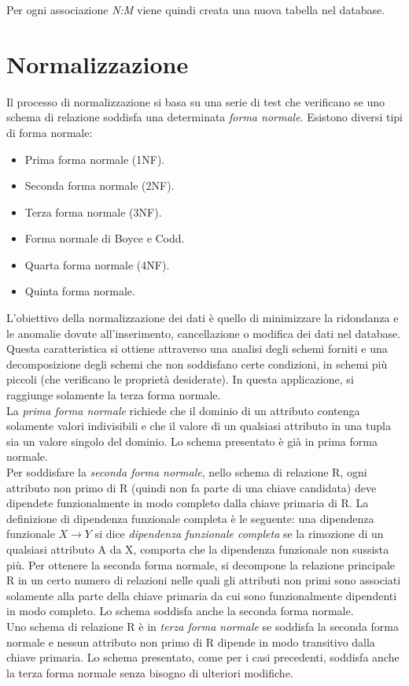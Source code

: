 \documentclass[paper=a4, fontsize=11pt,x11names]{report}
\begin{document}
Per ogni associazione \textit{N:M} viene quindi creata una nuova tabella nel database.

\chapter{Normalizzazione}
Il processo di normalizzazione si basa su una serie di test che verificano se uno schema di relazione soddisfa una determinata \textit{forma normale}. Esistono diversi tipi di forma normale:
\begin{itemize}
\item Prima forma normale (1NF).
\item Seconda forma normale (2NF).
\item Terza forma normale (3NF).
\item Forma normale di Boyce e Codd.
\item Quarta forma normale (4NF).
\item Quinta forma normale.
\end{itemize}
L'obiettivo della normalizzazione dei dati è quello di minimizzare la ridondanza e le anomalie dovute all'inserimento, cancellazione o modifica dei dati nel database. Questa caratteristica si ottiene attraverso una analisi degli schemi forniti e una decomposizione degli schemi che non soddisfano certe condizioni, in schemi più piccoli (che verificano le proprietà desiderate). In questa applicazione, si raggiunge solamente la terza forma normale.
\\
La \textit{prima forma normale} richiede che il dominio di un attributo contenga solamente valori indivisibili e che il valore di un qualsiasi attributo in una tupla sia un valore singolo del dominio. Lo schema presentato è già in prima forma normale.
\\
Per soddisfare la \textit{seconda forma normale}, nello schema di relazione R, ogni attributo non primo di R (quindi non fa parte di una chiave candidata) deve dipendete funzionalmente in modo completo dalla chiave primaria di R. La definizione di dipendenza funzionale completa è le seguente: una dipendenza funzionale $X \rightarrow Y$ si dice \textit{dipendenza funzionale completa} se la rimozione di un qualsiasi attributo A da X, comporta che la dipendenza funzionale non sussista più. Per ottenere la seconda forma normale, si decompone la relazione principale R in un certo numero di relazioni nelle quali gli attributi non primi sono associati solamente alla parte della chiave primaria da cui sono funzionalmente dipendenti in modo completo. Lo schema soddisfa anche la seconda forma normale.
\\
Uno schema di relazione R è in \textit{terza forma normale} se soddisfa la seconda forma normale e nessun attributo non primo di R dipende in modo transitivo dalla chiave primaria. Lo schema presentato, come per i casi precedenti, soddisfa anche la terza forma normale senza bisogno di ulteriori modifiche.
\end{document}
